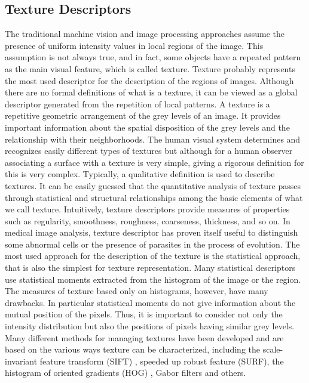 \subsection{Texture Descriptors} %
The traditional machine vision and image processing approaches assume the presence of uniform intensity values in local regions of the image. This assumption is not always true, and in fact, some objects have a repeated pattern as the main visual feature, which is called texture. Texture probably represents the most used descriptor for the description of the regions of images. Although there are no formal definitions of what is a texture, it can be viewed as a global descriptor generated from the repetition of local patterns. A texture is a repetitive geometric arrangement of the grey levels of an image. It provides important information about the spatial disposition of the grey levels and the relationship with their neighborhoods. The human visual system determines and recognizes easily different types of textures but although for a human observer associating a surface with a texture is very simple, giving a rigorous definition for this is very complex. Typically, a qualitative definition is used to describe textures. It can be easily guessed that the quantitative analysis of texture passes through statistical and structural relationships among the basic elements of what we call texture. Intuitively, texture descriptors provide measures of properties such as regularity, smoothness, roughness, coarseness, thickness, and so on. In medical image analysis, texture descriptor has proven itself useful to distinguish some abnormal cells or the presence of parasites in the process of evolution. The most used approach for the description of the texture is the statistical approach, that is also the simplest for texture representation. Many statistical descriptors use statistical moments extracted from the histogram of the image or the region. The measures of texture based only on histograms, however, have many drawbacks. In particular statistical moments do not give information about the mutual position of the pixels. Thus, it is important to consider not only the intensity distribution but also the positions of pixels having similar grey levels. Many different methods for managing textures have been developed and are based on the various ways texture can be characterized, including the scale-invariant feature transform (SIFT) \cite{Lowe}, speeded up robust feature (SURF)\cite{Bay}, the histogram of oriented gradients (HOG) \cite{Dalal}, Gabor filters \cite{Jain} and others.

